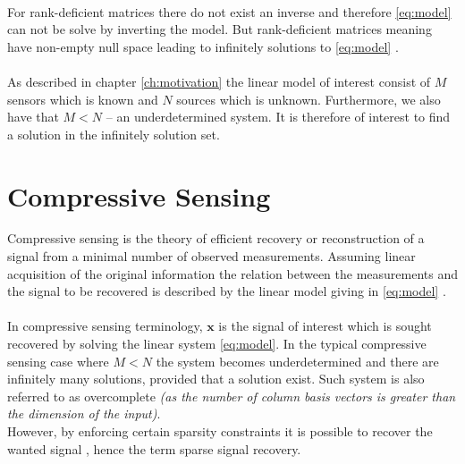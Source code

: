 \\
For rank-deficient matrices there do not exist an inverse and therefore \eqref{eq:model} can not be solve by inverting the model. But rank-deficient matrices  meaning have non-empty null space leading to infinitely solutions to \eqref{eq:model} \cite[p. ix]{CS}.
\\ \\
As described in chapter \ref{ch:motivation} the linear model of interest consist of $M$ sensors which is known and $N$ sources which is unknown. Furthermore, we also have that $M < N$ -- an underdetermined system. It is therefore of interest to find a solution in the infinitely solution set.

\section{Compressive Sensing}\label{sec:CS}
Compressive sensing is the theory of efficient recovery or reconstruction of a signal from a minimal number of observed measurements. Assuming linear acquisition of the original information the relation between the measurements and the signal to be recovered is described by the linear model giving in \eqref{eq:model} \cite{FR}.  \\ \\
In compressive sensing terminology, $\mathbf{x}$ is the signal of interest which is sought recovered by solving the linear system \eqref{eq:model}. In the typical compressive sensing case where $M < N$ the system becomes underdetermined and there are infinitely many solutions, provided that a solution exist. Such system is also referred to as overcomplete \textit{(as the number of column basis vectors is greater than the dimension of the input)}.\\
However, by enforcing certain sparsity constraints it is possible to recover the wanted signal \cite{FR}, hence the term sparse signal recovery.

